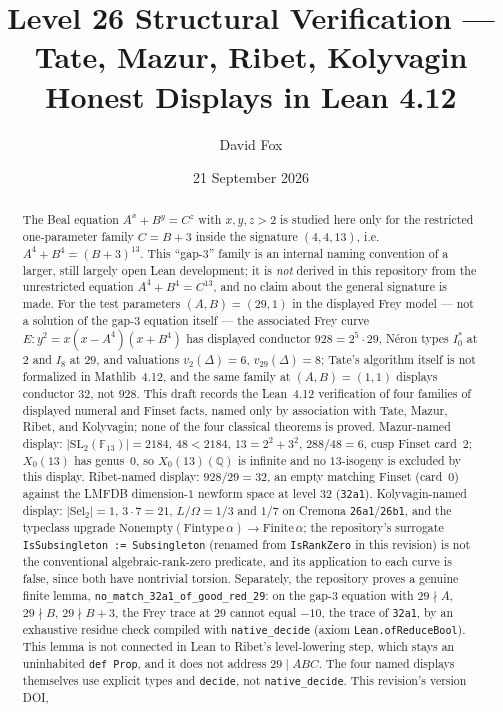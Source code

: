 \documentclass[11pt,reqno]{amsart}
\title[Level 26 Structural Verification]{Level 26 Structural Verification ---
Tate, Mazur, Ribet, Kolyvagin Honest Displays in Lean 4.12}
\author{David Fox}
\date{21 September 2026}
\theoremstyle{definition}
\theoremstyle{remark}
\newcommand{\Q}{\mathbb{Q}}
\newcommand{\F}{\mathbb{F}}
\newcommand{\Sel}{\mathrm{Sel}}
\newcommand{\SL}{\mathrm{SL}}
\newcommand{\cO}{\Omega}
\begin{document}
\begin{abstract}
The Beal equation $A^x+B^y=C^z$ with $x,y,z>2$ is studied here only
for the restricted one-parameter family $C=B+3$ inside the signature
$(4,4,13)$, i.e.\ $A^4+B^4=(B+3)^{13}$. This ``gap-3'' family is an
internal naming convention of a larger, still largely open Lean
development; it is \emph{not} derived in this repository from the
unrestricted equation $A^4+B^4=C^{13}$, and no claim about the
general signature is made. For the test parameters
$(A,B)=(29,1)$ in the displayed Frey model --- not a solution of
the gap-3 equation itself --- the associated Frey curve
$E:y^2=x(x-A^4)(x+B^4)$ has displayed conductor $928=2^5\cdot 29$,
N\'eron types $I_0^*$ at $2$ and $I_8$ at $29$, and valuations
$v_2(\Delta)=6$, $v_{29}(\Delta)=8$; Tate's algorithm itself is not
formalized in Mathlib~4.12, and the same family at $(A,B)=(1,1)$
displays conductor $32$, not $928$. This draft records the
Lean~4.12 verification of four families of displayed numeral and
Finset facts, named only by association with Tate, Mazur, Ribet,
and Kolyvagin; none of the four classical theorems is proved.
Mazur-named display: $\lvert\SL_2(\F_{13})\rvert=2184$, $48<2184$,
$13=2^2+3^2$, $288/48=6$, cusp Finset card~$2$; $X_0(13)$ has
genus~$0$, so $X_0(13)(\Q)$ is infinite and no $13$-isogeny is
excluded by this display. Ribet-named display: $928/29=32$, an
empty matching Finset (card~$0$) against the LMFDB dimension-$1$
newform space at level $32$ (\texttt{32a1}). Kolyvagin-named
display: $\lvert\Sel_2\rvert=1$, $3\cdot 7=21$, $L/\cO=1/3$ and
$1/7$ on Cremona \texttt{26a1}/\texttt{26b1}, and the typeclass
upgrade $\mathrm{Nonempty}(\mathrm{Fintype}\,\alpha)\to
\mathrm{Finite}\,\alpha$; the repository's surrogate
\texttt{IsSubsingleton := Subsingleton} (renamed from
\texttt{IsRankZero} in this revision) is not the conventional
algebraic-rank-zero predicate, and its application to each curve is
false, since both have nontrivial torsion. Separately, the
repository proves a genuine finite lemma,
\texttt{no\_match\_32a1\_of\_good\_red\_29}: on the gap-3 equation
with $29\nmid A$, $29\nmid B$, $29\nmid B+3$, the Frey trace at
$29$ cannot equal $-10$, the trace of \texttt{32a1}, by an
exhaustive residue check compiled with \texttt{native\_decide}
(axiom \texttt{Lean.ofReduceBool}). This lemma is not connected in
Lean to Ribet's level-lowering step, which stays an uninhabited
\texttt{def Prop}, and it does not address $29\mid ABC$. The four
named displays themselves use explicit types and \texttt{decide},
not \texttt{native\_decide}. This revision's version DOI,

\end{abstract}
\end{document}
